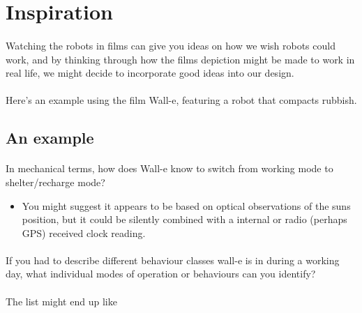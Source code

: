 \documentclass[11pt]{book}
\begin{document}
\clearpage

\section{Inspiration}


\paragraph{} Watching the robots in films can give you ideas on how we wish robots could work, and by thinking through how the films depiction might be made to work in real life, we might decide to incorporate good ideas into our design.

\paragraph{} Here's an example using the film Wall-e, featuring a robot that compacts rubbish.

\subsection{An example}

\paragraph{} In mechanical terms, how does Wall-e know to switch from working mode to shelter/recharge mode?

\begin{itemize}
\item You might suggest it appears to be based on optical observations of the suns position, but it could be silently combined with a internal or radio (perhaps GPS) received clock reading.
\end{itemize}

\paragraph{} If you had to describe different behaviour classes wall-e is in during a working day, what individual modes of operation or behaviours can you identify?

\paragraph{} The list might end up like
\end{document}
